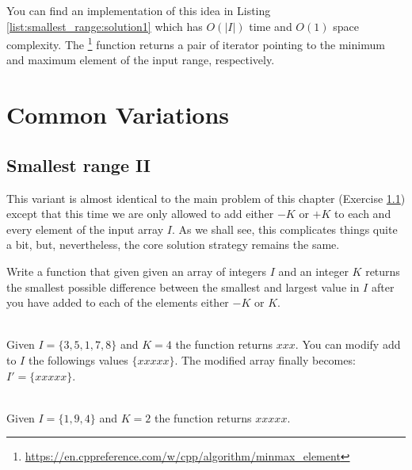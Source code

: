 You can find an implementation of this idea in Listing \ref{list:smallest_range:solution1} which has
$O(|I|)$ time and $O(1)$ space complexity.
The \footnote{\url{https://en.cppreference.com/w/cpp/algorithm/minmax_element}} function  returns a pair of iterator pointing to the minimum and maximum element of the input range, respectively.



\section{Common Variations}
\subsection{Smallest range \RN{2} } This variant is almost identical to the main problem of this
chapter (Exercise \ref{}) except that this time we are only allowed to add either $-K$ or $+K$ to
each and every element of the input array $I$. As we shall see, this complicates things quite a bit,
but, nevertheless, the core solution strategy  remains the same. 

\begin{exercise}
	\label{example:smallest_range:variation1:exercice1}
	Write a function that given given an array of integers $I$ and an integer $K$ returns the
	smallest possible difference between the smallest and largest value in $I$ after you have added
	to each of the elements either $-K$ or $K$.
	
		\begin{example}
			\label{example:smallest_range:variation1:example1}
			\hfill \\
			Given $I = \{3,5,1,7,8\}$ and $K=4$ the function returns $xxx$. You can modify add to
			$I$ the followings values $\{xxxxx\}$. The modified array finally becomes:
			$I'=\{xxxxx\}$. 
			
		\end{example}
	
		\begin{example}
			\label{example:smallest_range:variation1:example2}
			\hfill \\
			Given $I = \{1,9,4\}$ and $K=2$ the function returns $xxxxx$.
		\end{example}
	
	\end{exercise}
